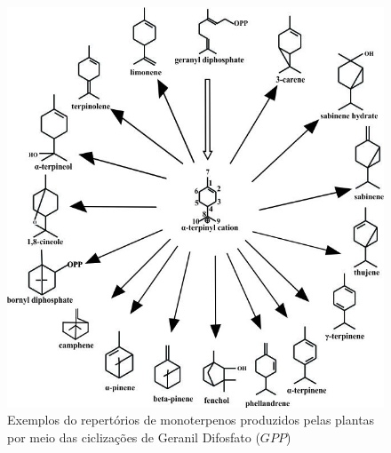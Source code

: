 \begin{figure}[H]
	\centering
	\includegraphics[width=.86\linewidth]{images/img.jpg}
	\caption{{ Exemplos do repertórios de monoterpenos produzidos pelas plantas por meio das ciclizações de Geranil Difosfato ($GPP$)}}
	\label{figIntroCarbocation}
\end{figure}


